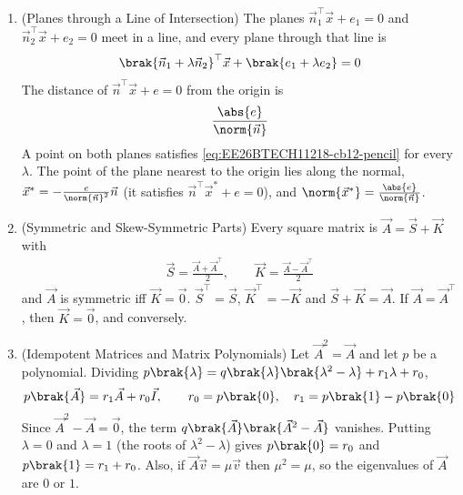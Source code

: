 \begin{enumerate}[label=\thesubsection.\arabic*, ref=\thesubsection.\theenumi,itemsep=1.5em]
\item (Planes through a Line of Intersection) The planes $\vec{n}_1^{\top}\vec{x}+e_1=0$ and $\vec{n}_2^{\top}\vec{x}+e_2=0$ meet in a line, and every plane through that line is
\begin{align}
\brak{\vec{n}_1+\lambda\vec{n}_2}^{\top}\vec{x} + \brak{e_1+\lambda e_2} = 0
\label{eq:EE26BTECH11218-cb12-pencil}
\end{align}
The distance of $\vec{n}^{\top}\vec{x}+e=0$ from the origin is
\begin{align}
\frac{\abs{e}}{\norm{\vec{n}}}
\label{eq:EE26BTECH11218-cb12-plane-dist}
\end{align}
\solution A point on both planes satisfies \eqref{eq:EE26BTECH11218-cb12-pencil} for every $\lambda$. The point of the plane nearest to the origin lies along the normal, $\vec{x}^{*}=-\frac{e}{\norm{\vec{n}}^2}\vec{n}$ (it satisfies $\vec{n}^{\top}\vec{x}^{*}+e=0$), and $\norm{\vec{x}^{*}}=\frac{\abs{e}}{\norm{\vec{n}}}$.

\item (Symmetric and Skew-Symmetric Parts) Every square matrix is $\vec{A}=\vec{S}+\vec{K}$ with
\begin{align}
\vec{S}=\frac{\vec{A}+\vec{A}^{\top}}{2}, \qquad \vec{K}=\frac{\vec{A}-\vec{A}^{\top}}{2}
\label{eq:EE26BTECH11218-cb12-symskew}
\end{align}
and $\vec{A}$ is symmetric iff $\vec{K}=\vec{0}$.
\solution $\vec{S}^{\top}=\vec{S}$, $\vec{K}^{\top}=-\vec{K}$ and $\vec{S}+\vec{K}=\vec{A}$. If $\vec{A}=\vec{A}^{\top}$, then $\vec{K}=\vec{0}$, and conversely.

\item (Idempotent Matrices and Matrix Polynomials) Let $\vec{A}^2=\vec{A}$ and let $p$ be a polynomial. Dividing $p\brak{\lambda}=q\brak{\lambda}\brak{\lambda^2-\lambda}+r_1\lambda+r_0$,
\begin{align}
p\brak{\vec{A}} = r_1\vec{A}+r_0\vec{I}, \qquad r_0=p\brak{0}, \quad r_1=p\brak{1}-p\brak{0}
\label{eq:EE26BTECH11218-cb12-idem}
\end{align}
\solution Since $\vec{A}^2-\vec{A}=\vec{0}$, the term $q\brak{\vec{A}}\brak{\vec{A}^2-\vec{A}}$ vanishes. Putting $\lambda=0$ and $\lambda=1$ (the roots of $\lambda^2-\lambda$) gives $p\brak{0}=r_0$ and $p\brak{1}=r_1+r_0$. Also, if $\vec{A}\vec{v}=\mu\vec{v}$ then $\mu^2=\mu$, so the eigenvalues of $\vec{A}$ are $0$ or $1$.


\end{enumerate}
